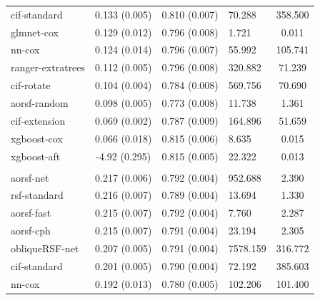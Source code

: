 \documentclass[twoside,11pt]{article}\usepackage[]{graphicx}\usepackage[]{xcolor}
\newenvironment{knitrout}{}{} %
\begin{document}
\begin{knitrout}
\begin{longtable}[t]{lcclc}
\hspace{1em}cif-standard & 0.133 (0.005) & 0.810 (0.007) & 70.288 & 358.500\\
\hspace{1em}glmnet-cox & 0.129 (0.012) & 0.796 (0.008) & 1.721 & 0.011\\
\hspace{1em}nn-cox & 0.124 (0.014) & 0.796 (0.007) & 55.992 & 105.741\\
\hspace{1em}ranger-extratrees & 0.112 (0.005) & 0.796 (0.008) & 320.882 & 71.239\\
\hspace{1em}cif-rotate & 0.104 (0.004) & 0.784 (0.008) & 569.756 & 70.690\\
\hspace{1em}aorsf-random & 0.098 (0.005) & 0.773 (0.008) & 11.738 & 1.361\\
\hspace{1em}cif-extension & 0.069 (0.002) & 0.787 (0.009) & 164.896 & 51.659\\
\hspace{1em}xgboost-cox & 0.066 (0.018) & 0.815 (0.006) & 8.635 & 0.015\\
\hspace{1em}xgboost-aft & -4.92 (0.295) & 0.815 (0.005) & 22.322 & 0.013\\
\addlinespace[0.3em]
\hline
\multicolumn{5}{l}{\textit{\textbf{ARIC; death, n = 13623, p = 41}}}\\
\hline
\hspace{1em}aorsf-net & 0.217 (0.006) & 0.792 (0.004) & 952.688 & 2.390\\
\hspace{1em}rsf-standard & 0.216 (0.007) & 0.789 (0.004) & 13.694 & 1.330\\
\hspace{1em}aorsf-fast & 0.215 (0.007) & 0.792 (0.004) & 7.760 & 2.287\\
\hspace{1em}aorsf-cph & 0.215 (0.007) & 0.791 (0.004) & 23.194 & 2.305\\
\hspace{1em}obliqueRSF-net & 0.207 (0.005) & 0.791 (0.004) & 7578.159 & 316.772\\
\hspace{1em}cif-standard & 0.201 (0.005) & 0.790 (0.004) & 72.192 & 385.603\\
\hspace{1em}nn-cox & 0.192 (0.013) & 0.780 (0.005) & 102.206 & 101.400\\

\end{longtable}
\end{knitrout}
\end{document}
